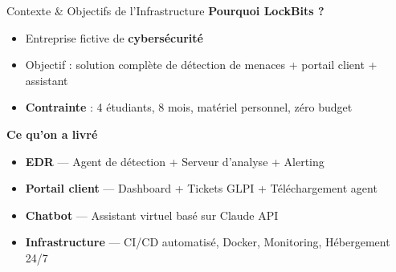 \documentclass[xcolor=dvipsnames, aspectratio=169, 10pt]{beamer}
\newcommand{\bitem}{\item[$\bullet$]}
\begin{document}
\begin{frame}{Contexte \& Objectifs de l'Infrastructure}
  \textbf{Pourquoi LockBits ?}
  \begin{itemize}
    \bitem Entreprise fictive de \textbf{cybersécurité}
    \bitem Objectif : solution complète de détection de menaces + portail client + assistant
    \bitem \textbf{Contrainte} : 4 étudiants, 8 mois, matériel personnel, zéro budget
  \end{itemize}
  \vspace{0.2cm}
  \textbf{Ce qu'on a livré}
  \begin{itemize}
    \bitem \textbf{EDR} — Agent de détection + Serveur d'analyse + Alerting
    \bitem \textbf{Portail client} — Dashboard + Tickets GLPI + Téléchargement agent
    \bitem \textbf{Chatbot} — Assistant virtuel basé sur Claude API
    \bitem \textbf{Infrastructure} — CI/CD automatisé, Docker, Monitoring, Hébergement 24/7
  \end{itemize}
\end{frame}
\end{document}
